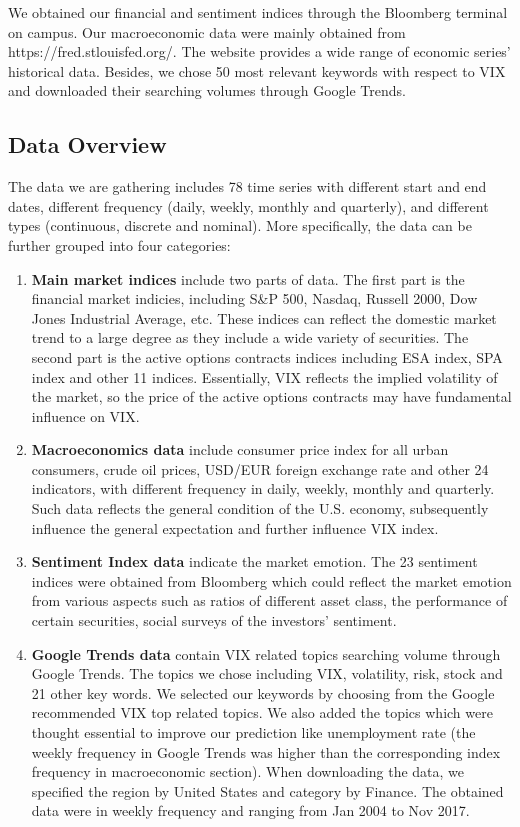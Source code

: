 \documentclass[fleqn,10pt]{SelfArx} %
\begin{document}
\noindent
We obtained our financial and sentiment indices through the Bloomberg terminal on campus. Our macroeconomic data were mainly obtained from https://fred.stlouisfed.org/. The website provides a wide range of economic series' historical data. Besides, we chose 50 most relevant keywords with respect to VIX and downloaded their searching volumes through Google Trends.

\subsection{Data Overview}
The data we are gathering includes 78 time series with different start and end dates, different frequency (daily, weekly, monthly and quarterly), and different types (continuous, discrete and nominal). More specifically, the data can be further grouped into four categories:
\begin{enumerate}%
    \item \textbf{Main market indices} include two parts of data. The first part is the financial market indicies, including S\&P 500, Nasdaq, Russell 2000, Dow Jones Industrial Average, etc. These indices can reflect the domestic market trend to a large degree as they include a wide variety of securities. The second part is the active options contracts indices including ESA index, SPA index and other 11 indices. Essentially, VIX reflects the implied volatility of the market, so the price of the active options contracts may have fundamental influence on VIX.
    \item \textbf{Macroeconomics data} include consumer price index for all urban consumers, crude oil prices, USD/EUR foreign exchange rate and other 24 indicators, with different frequency in daily, weekly, monthly and quarterly. Such data reflects the general condition of the U.S. economy, subsequently influence the general expectation and further influence VIX index.
    \item \textbf{Sentiment Index data} indicate the market emotion. The 23 sentiment indices were obtained from Bloomberg which could reflect the market emotion from various aspects such as ratios of different asset class, the performance of certain securities, social surveys of the investors’ sentiment. 
    \item \textbf{Google Trends data} contain VIX related topics searching volume through Google Trends. The topics we chose including VIX, volatility, risk, stock and 21 other key words. We selected our keywords by choosing from the Google recommended VIX top related topics. We also added the topics which were thought essential to improve our prediction like unemployment rate (the weekly frequency in Google Trends was higher than the corresponding index frequency in macroeconomic section). When downloading the data, we specified the region by United States and category by Finance. The obtained data were in weekly frequency and ranging from Jan 2004 to Nov 2017.
 
\end{enumerate}
\end{document}
